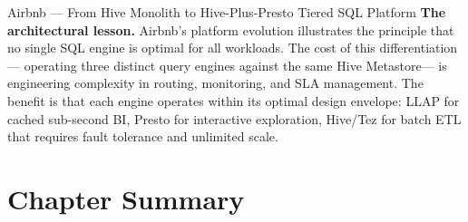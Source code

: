 \begin{casestudy}{Airbnb --- From Hive Monolith to Hive-Plus-Presto Tiered SQL Platform}
\textbf{The architectural lesson.}
Airbnb's platform evolution illustrates the principle that no single
SQL engine is optimal for all workloads. The cost of this differentiation---
operating three distinct query engines against the same Hive Metastore---
is engineering complexity in routing, monitoring, and SLA management.
The benefit is that each engine operates within its optimal design envelope:
LLAP for cached sub-second BI, Presto for interactive exploration, Hive/Tez
for batch ETL that requires fault tolerance and unlimited scale.
\end{casestudy}

\section*{Chapter Summary}
\label{sec:ch7-summary}

